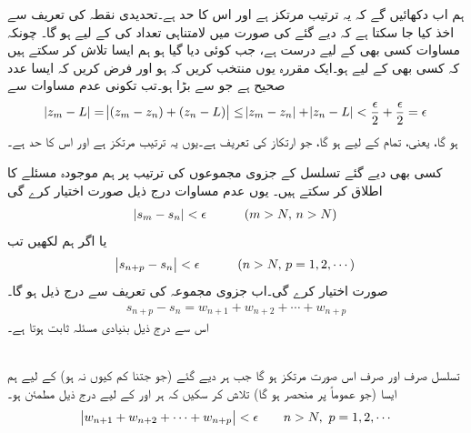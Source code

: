 ہم اب دکھائیں گے کہ یہ ترتیب مرتکز ہے اور اس کا حد  ہے۔تحدیدی نقطہ کی تعریف سے اخذ کیا جا سکتا ہے کہ دیے گئے  کی صورت میں لامتناہی تعداد کی  کے لیے  ہو گا۔ چونکہ مساوات  کسی بھی  کے لیے درست ہے، جب کوئی  دیا گیا ہو ہم ایسا  تلاش کر سکتے ہیں کہ کسی بھی  کے  لیے 
 ہو۔ایک مقررہ  یوں منتخب کریں کہ  ہو اور فرض کریں کہ  ایسا عدد صحیح ہے جو  سے بڑا ہو۔تب تکونی عدم مساوات سے
\begin{align*}
\abs{z_m-L}=\abs{(z_m-z_n)+(z_n-L)}\le \abs{z_m-z_n}+\abs{z_n-L}<\frac{\epsilon}{2}+\frac{\epsilon}{2}=\epsilon
\end{align*}
ہو گا، یعنی، تمام  کے لیے  ہو گا، جو ارتکاز کی تعریف ہے۔یوں یہ ترتیب مرتکز ہے اور اس کا حد  ہے۔

کسی بھی دیے گئے تسلسل  کے جزوی مجموعوں  کی ترتیب پر ہم موجودہ مسئلے کا اطلاق کر سکتے ہیں۔ یوں عدم مساوات  درج ذیل صورت اختیار کرے گی
\begin{align*}
\abs{s_m-s_n}<\epsilon\quad \quad \quad (m>N,\,n>N)
\end{align*}
یا اگر ہم  لکھیں تب 
\begin{align*}
\abs{s_{n+p}-s_n}<\epsilon\quad \quad \quad (n>N,\,p=1,2,\cdots)
\end{align*}
صورت اختیار کرے گی۔اب جزوی مجموعہ کی تعریف سے درج ذیل ہو گا۔
\begin{align*}
s_{n+p}-s_n=w_{n+1}+w_{n+2}+\cdots+w_{n+p}
\end{align*}
اس سے درج ذیل بنیادی مسئلہ ثابت ہوتا ہے۔

\quad {}\\
تسلسل  صرف اور صرف اس صورت مرتکز ہو گا جب ہر دیے گئے  (جو جتنا کم کیوں نہ ہو) کے لیے ہم ایسا  (جو عموماً  پر منحصر ہو گا) تلاش کر سکیں کہ ہر  اور  کے لیے درج ذیل مطمئن ہو۔
\begin{align*}
\abs{w_{n+1}+w_{n+2}+\cdots+w_{n+p}}<\epsilon \quad \quad n>N,\,\, p=1,2,\cdots 
\end{align*}

